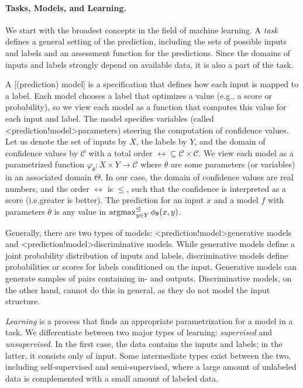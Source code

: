 \documentclass[../document.tex]{subfiles}
\begin{document}
    \paragraph{Tasks, Models, and Learning.}
    We start with the broadest concepts in the field of machine learning.
    A \emph{task} defines a general setting of the prediction, including the sets of possible inputs and labels and an assessment function for the predictions.
    Since the domains of inputs and labels strongly depend on available data, it is also a part of the task.

    A [(prediction) model] is a specification that defines how each input is mapped to a label.
    Each model chooses a label that optimizes a  value (e.g., a score or probability), so we view each model as a function that computes this value for each input and label.
    The model specifies variables (called <prediction!model>{parameters}) steering the computation of confidence values.
    Let us denote the set of inputs by \(X\), the labels by \(Y\), and the domain of confidence values by \(\mathcal{C}\) with a total order \(\rel \subseteq \mathcal{C} \times \mathcal{C}\).
    We view each model as a parametrized function \(\varphi_\theta\colon X \times Y \to \mathcal{C}\) where \(\theta\) are some parameters (or variables) in an associated domain \(\Theta\).
    In our case, the domain of confidence values are real numbers, and the order \(\rel\) is \(\leq\), such that the confidence is interpreted as a score (i.e.\@ greater is better).
    The prediction for an input \(x\) and a model \(f\) with parameters \(\theta\) is any value in \(\operatorname{arg max}^{\mathrel{\unlhd}}_{y \in Y} \phi_\theta(x, y)\).

    Generally, there are two types of models: <prediction!model>{generative models} and <prediction!model>{discriminative models}.
    While generative models define a joint probability distribution of inputs and labels, discriminative models define probabilities or scores for labels conditioned on the input.
    Generative models can generate samples of pairs containing in- and outputs.
    Discriminative models, on the other hand, cannot do this in general, as they do not model the input structure.

    \emph{Learning} is a process that finds an appropriate parametrization for a model in a task.
    We differentiate between two major types of learning: \emph{supervised} and \emph{unsupervised}.
    In the first case, the data contains the inputs and labels; in the latter, it consists only of input.
    Some intermediate types exist between the two, including self-supervised and semi-supervised, where a large amount of unlabeled data is complemented with a small amount of labeled data.
\end{document}
